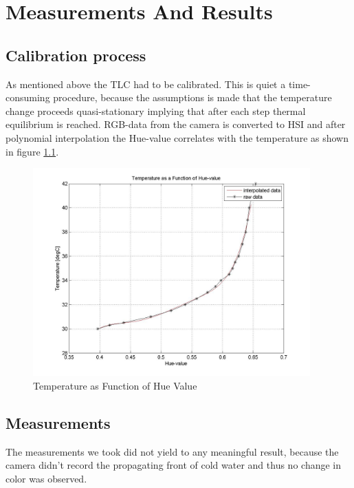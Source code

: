 \chapter{Measurements And Results}\label{sec:results}

\section{Calibration process}
As mentioned above the TLC had to be calibrated. This is quiet a time-consuming procedure, because the assumptions is made that the temperature change proceeds quasi-stationary implying that after each step thermal equilibrium is reached. RGB-data from the camera is converted to HSI and after polynomial interpolation the Hue-value correlates with the temperature as shown in figure \ref{fig:calibration}.

\begin{figure}[H]
\includegraphics[width=0.95\textwidth]{pics/calibration}
\caption{Temperature as Function of Hue Value}
\label{fig:calibration}
\end{figure}


\section{Measurements}
The measurements we took did not yield to any meaningful result, because the camera didn't record the propagating front of cold water and thus no change in color was observed.
